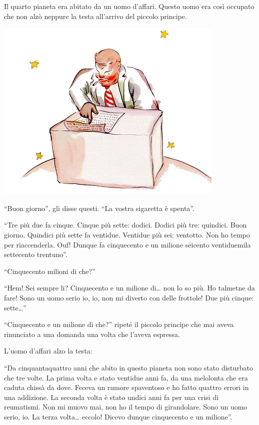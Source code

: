 \documentclass[11pt]{scrbook}
\begin{document}
Il quarto pianeta era abitato da un uomo d'affari. Questo uomo era così occupato che non alzò neppure la testa all'arrivo del piccolo principe.

\begin{center}
\includegraphics{img/13a}
\end{center}

``Buon giorno'', gli disse questi. ``La vostra sigaretta è spenta''.

``Tre più due fa cinque. Cinque più sette: dodici. Dodici più tre: quindici. Buon giorno. Quindici più sette fa ventidue. Ventidue più sei: ventotto. Non ho tempo per riaccenderla. Ouf! Dunque fa cinquecento e un milione seicento ventiduemila settecento trentuno''.

``Cinquecento milioni di che?''

``Hem! Sei sempre li? Cinquecento e un milione di\ldots{} non lo so più. Ho talmetne da fare! Sono un uomo serio io, io, non mi diverto con delle frottole! Due più cinque: sette\ldots{}''

``Cinquecento e un milione di che?'' ripeté il piccolo principe che mai aveva rinunciato a una domanda una volta che l'aveva espressa.

L'uomo d'affari alzo la testa:

``Da cinquantaquattro anni che abito in questo pianeta non sono stato disturbato che tre volte. La prima volta e stato ventidue anni fa, da una melolonta che era caduta chissà da dove. Feceva un rumore spaventoso e ho fatto quattro errori in una addizione. La seconda volta è stato undici anni fa per una crisi di reumatismi. Non mi muovo mai, non ho il tempo di girandolare. Sono un uomo serio, io. La terza volta\ldots{} eccolo! Dicevo dunque cinquecento e un milione''.
\end{document}
